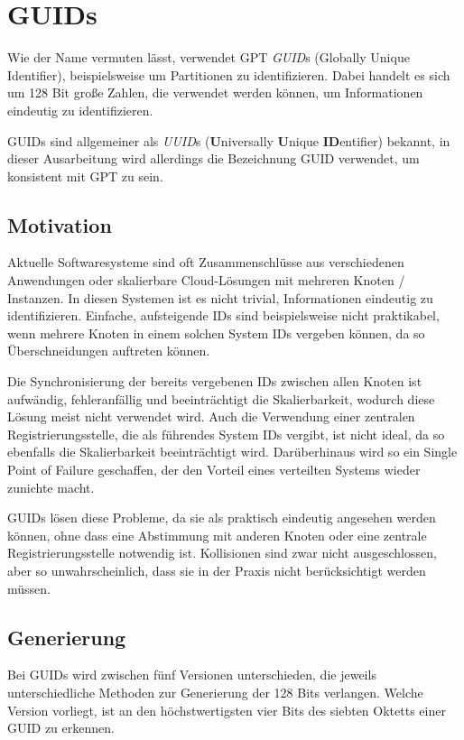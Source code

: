 \section{GUIDs}

Wie der Name vermuten lässt, verwendet GPT \textit{GUID}s (Globally Unique Identifier), beispielsweise um Partitionen zu identifizieren.
Dabei handelt es sich um 128 Bit große Zahlen, die verwendet werden können, um Informationen eindeutig zu identifizieren.

GUIDs sind allgemeiner als \textit{UUID}s (\textbf{U}niversally \textbf{U}nique \textbf{ID}entifier) bekannt, in dieser Ausarbeitung wird allerdings die Bezeichnung GUID verwendet, um konsistent mit GPT zu sein.

\subsection{Motivation}
Aktuelle Softwaresysteme sind oft Zusammenschlüsse aus verschiedenen Anwendungen oder skalierbare Cloud-Lösungen mit mehreren Knoten / Instanzen.
In diesen Systemen ist es nicht trivial, Informationen eindeutig zu identifizieren. Einfache, aufsteigende IDs sind beispielsweise nicht praktikabel, wenn mehrere Knoten in einem solchen System IDs vergeben können, da so Überschneidungen auftreten können.

Die Synchronisierung der bereits vergebenen IDs zwischen allen Knoten ist aufwändig, fehleranfällig und beeinträchtigt die Skalierbarkeit, wodurch diese Lösung meist nicht verwendet wird.
Auch die Verwendung einer zentralen Registrierungsstelle, die als führendes System IDs vergibt, ist nicht ideal, da so ebenfalls die Skalierbarkeit beeinträchtigt wird. 
Darüberhinaus wird so ein Single Point of Failure geschaffen, der den Vorteil eines verteilten Systems wieder zunichte macht.

GUIDs lösen diese Probleme, da sie als praktisch eindeutig angesehen werden können, ohne dass eine Abstimmung mit anderen Knoten oder eine zentrale Registrierungsstelle notwendig ist.
Kollisionen sind zwar nicht ausgeschlossen, aber so unwahrscheinlich, dass sie in der Praxis nicht berücksichtigt werden müssen.


\subsection{Generierung}
Bei GUIDs wird zwischen fünf Versionen unterschieden, die jeweils unterschiedliche Methoden zur Generierung der 128 Bits verlangen.
Welche Version vorliegt, ist an den höchstwertigsten vier Bits des siebten Oktetts einer GUID zu erkennen.

